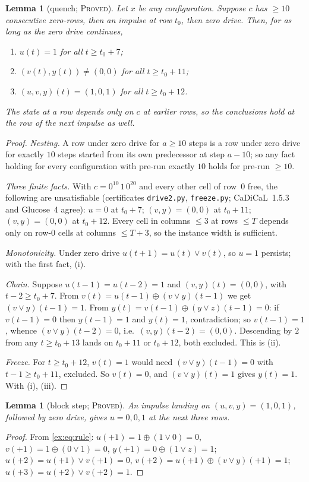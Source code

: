 \documentclass[11pt]{article}
\newtheorem{lemma}[theorem]{Lemma}
\theoremstyle{definition}
\theoremstyle{remark}
\newcommand{\PROVED}{\textsc{Proved}}
\begin{document}
\begin{lemma}[quench; \PROVED]\label{ex:lem:quench}
Let $x$ be any configuration. Suppose $c$ has $\ge10$ consecutive zero-rows, then an impulse at row $t_0$, then zero drive. Then, for as long as the zero drive continues,
\begin{enumerate}[nosep,label=(\roman*)]
\item $u(t)=1$ for all $t\ge t_0+7$;
\item $(v(t),y(t))\ne(0,0)$ for all $t\ge t_0+11$;
\item $(u,v,y)(t)=(1,0,1)$ for all $t\ge t_0+12$.
\end{enumerate}
The state at a row depends only on $c$ at earlier rows, so the conclusions hold at the row of the next impulse as well.
\end{lemma}
\begin{proof}
\emph{Nesting.} A row under zero drive for $a\ge10$ steps is a row under zero drive for exactly $10$ steps started from its own predecessor at step $a-10$; so any fact holding for every configuration with pre-run exactly $10$ holds for pre-run $\ge10$.

\emph{Three finite facts.} With $c=0^{10}\,1\,0^{20}$ and every other cell of row~$0$ free, the following are unsatisfiable (certificates \texttt{drive2.py}, \texttt{freeze.py}; CaDiCaL~1.5.3 and Glucose~4 agree): $u=0$ at $t_0+7$; $(v,y)=(0,0)$ at $t_0+11$; $(v,y)=(0,0)$ at $t_0+12$. Every cell in columns $\le3$ at rows $\le T$ depends only on row-$0$ cells at columns $\le T+3$, so the instance width is sufficient.

\emph{Monotonicity.} Under zero drive $u(t+1)=u(t)\vee v(t)$, so $u=1$ persists; with the first fact, (i).

\emph{Chain.} Suppose $u(t-1)=u(t-2)=1$ and $(v,y)(t)=(0,0)$, with $t-2\ge t_0+7$. From $v(t)=u(t-1)\oplus(v\vee y)(t-1)$ we get $(v\vee y)(t-1)=1$. From $y(t)=v(t-1)\oplus(y\vee z)(t-1)=0$: if $v(t-1)=0$ then $y(t-1)=1$ and $y(t)=1$, contradiction; so $v(t-1)=1$, whence $(v\vee y)(t-2)=0$, i.e.\ $(v,y)(t-2)=(0,0)$. Descending by $2$ from any $t\ge t_0+13$ lands on $t_0+11$ or $t_0+12$, both excluded. This is (ii).

\emph{Freeze.} For $t\ge t_0+12$, $v(t)=1$ would need $(v\vee y)(t-1)=0$ with $t-1\ge t_0+11$, excluded. So $v(t)=0$, and $(v\vee y)(t)=1$ gives $y(t)=1$. With (i), (iii).
\end{proof}

\begin{lemma}[block step; \PROVED]\label{ex:lem:block}
An impulse landing on $(u,v,y)=(1,0,1)$, followed by zero drive, gives $u=0,0,1$ at the next three rows.
\end{lemma}
\begin{proof}
From \eqref{ex:eq:rule}: $u(+1)=1\oplus(1\vee0)=0$, $v(+1)=1\oplus(0\vee1)=0$, $y(+1)=0\oplus(1\vee z)=1$; $u(+2)=u(+1)\vee v(+1)=0$, $v(+2)=u(+1)\oplus(v\vee y)(+1)=1$; $u(+3)=u(+2)\vee v(+2)=1$.
\end{proof}
\end{document}
